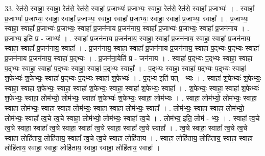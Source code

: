 \documentclass[17pt]{extarticle}
\begin{document}
33. रेत॑से॒ स्वाहा॒ स्वाहा॒ रेत॑से॒ रेत॑से॒ स्वाहा᳚ प्र॒जाभ्यः॑ प्र॒जाभ्यः॒ स्वाहा॒ रेत॑से॒ रेत॑से॒ स्वाहा᳚ प्र॒जाभ्यः॑ । . स्वाहा᳚ प्र॒जाभ्यः॑ प्र॒जाभ्यः॒ स्वाहा॒ स्वाहा᳚ प्र॒जाभ्यः॒ स्वाहा॒ स्वाहा᳚ प्र॒जाभ्यः॒ स्वाहा॒ स्वाहा᳚ प्र॒जाभ्यः॒ स्वाहा᳚ । . प्र॒जाभ्यः॒ स्वाहा॒ स्वाहा᳚ प्र॒जाभ्यः॑ प्र॒जाभ्यः॒ स्वाहा᳚ प्र॒जन॑नाय प्र॒जन॑नाय॒ स्वाहा᳚ प्र॒जाभ्यः॑ प्र॒जाभ्यः॒ स्वाहा᳚ प्र॒जन॑नाय । . प्र॒जाभ्य॒ इति॑ प्र - जाभ्यः॑ । . स्वाहा᳚ प्र॒जन॑नाय प्र॒जन॑नाय॒ स्वाहा॒ स्वाहा᳚ प्र॒जन॑नाय॒ स्वाहा॒ स्वाहा᳚ प्र॒जन॑नाय॒ स्वाहा॒ स्वाहा᳚ प्र॒जन॑नाय॒ स्वाहा᳚ । . प्र॒जन॑नाय॒ स्वाहा॒ स्वाहा᳚ प्र॒जन॑नाय प्र॒जन॑नाय॒ स्वाहा॑ प॒द्भ्यः प॒द्भ्यः स्वाहा᳚ प्र॒जन॑नाय प्र॒जन॑नाय॒ स्वाहा॑ प॒द्भ्यः । . प्र॒जन॑ना॒येति॑ प्र - जन॑नाय । . स्वाहा॑ प॒द्भ्यः प॒द्भ्यः स्वाहा॒ स्वाहा॑ प॒द्भ्यः स्वाहा॒ स्वाहा॑ प॒द्भ्यः स्वाहा॒ स्वाहा॑ प॒द्भ्यः स्वाहा᳚ । . प॒द्भ्यः स्वाहा॒ स्वाहा॑ प॒द्भ्यः प॒द्भ्यः स्वाहा॑ श॒फेभ्यः॑ श॒फेभ्यः॒ स्वाहा॑ प॒द्भ्यः प॒द्भ्यः स्वाहा॑ श॒फेभ्यः॑ । . प॒द्भ्य इति॑ पत् - भ्यः । . स्वाहा॑ श॒फेभ्यः॑ श॒फेभ्यः॒ स्वाहा॒ स्वाहा॑ श॒फेभ्यः॒ स्वाहा॒ स्वाहा॑ श॒फेभ्यः॒ स्वाहा॒ स्वाहा॑ श॒फेभ्यः॒ स्वाहा᳚ । . श॒फेभ्यः॒ स्वाहा॒ स्वाहा॑ श॒फेभ्यः॑ श॒फेभ्यः॒ स्वाहा॒ लोम॑भ्यो॒ लोम॑भ्यः॒ स्वाहा॑ श॒फेभ्यः॑ श॒फेभ्यः॒ स्वाहा॒ लोम॑भ्यः । . स्वाहा॒ लोम॑भ्यो॒ लोम॑भ्यः॒ स्वाहा॒ स्वाहा॒ लोम॑भ्यः॒ स्वाहा॒ स्वाहा॒ लोम॑भ्यः॒ स्वाहा॒ स्वाहा॒ लोम॑भ्यः॒ स्वाहा᳚ । . लोम॑भ्यः॒ स्वाहा॒ स्वाहा॒ लोम॑भ्यो॒ लोम॑भ्यः॒ स्वाहा᳚ त्व॒चे त्व॒चे स्वाहा॒ लोम॑भ्यो॒ लोम॑भ्यः॒ स्वाहा᳚ त्व॒चे । . लोम॑भ्य॒ इति॒ लोम॑ - भ्यः॒ । . स्वाहा᳚ त्व॒चे त्व॒चे स्वाहा॒ स्वाहा᳚ त्व॒चे स्वाहा॒ स्वाहा᳚ त्व॒चे स्वाहा॒ स्वाहा᳚ त्व॒चे स्वाहा᳚ । . त्व॒चे स्वाहा॒ स्वाहा᳚ त्व॒चे त्व॒चे स्वाहा॒ लोहि॑ताय॒ लोहि॑ताय॒ स्वाहा᳚ त्व॒चे त्व॒चे स्वाहा॒ लोहि॑ताय । . स्वाहा॒ लोहि॑ताय॒ लोहि॑ताय॒ स्वाहा॒ स्वाहा॒ लोहि॑ताय॒ स्वाहा॒ स्वाहा॒ लोहि॑ताय॒ स्वाहा॒ स्वाहा॒ लोहि॑ताय॒ स्वाहा᳚ । \newline
\end{document}
